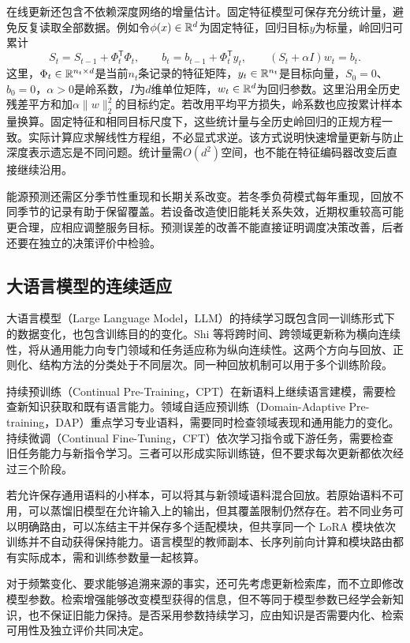 在线更新还包含不依赖深度网络的增量估计。固定特征模型可保存充分统计量，避免反复读取全部数据。例如令$\phi(x)\in\mathbb{R}^d$为固定特征，回归目标$y$为标量，岭回归可累计
\begin{equation}
 S_t=S_{t-1}+\Phi_t^{\mathsf T}\Phi_t,\qquad
 b_t=b_{t-1}+\Phi_t^{\mathsf T}y_t,\qquad
 (S_t+\alpha I)w_t=b_t.
\end{equation}
这里，$\Phi_t\in\mathbb{R}^{n_t\times d}$是当前$n_t$条记录的特征矩阵，$y_t\in\mathbb{R}^{n_t}$是目标向量，$S_0=0$、$b_0=0$，$\alpha>0$是岭系数，$I$为$d$维单位矩阵，$w_t\in\mathbb{R}^d$为回归参数。这里沿用全历史残差平方和加$\alpha\|w\|_2^2$的目标约定。若改用平均平方损失，岭系数也应按累计样本量换算。固定特征和相同目标尺度下，这些统计量与全历史岭回归的正规方程一致。实际计算应求解线性方程组，不必显式求逆。该方式说明快速增量更新与防止深度表示遗忘是不同问题。统计量需$O(d^2)$空间，也不能在特征编码器改变后直接继续沿用。

能源预测还需区分季节性重现和长期关系改变\cite{sayed2025energycl}。若冬季负荷模式每年重现，回放不同季节的记录有助于保留覆盖。若设备改造使旧能耗关系失效，近期权重较高可能更合理，应相应调整服务目标。预测误差的改善不能直接证明调度决策改善，后者还要在独立的决策评价中检验。

\subsection{大语言模型的连续适应}
大语言模型（Large Language Model，LLM）的持续学习既包含同一训练形式下的数据变化，也包含训练目的的变化。Shi 等将跨时间、跨领域更新称为横向连续性，将从通用能力向专门领域和任务适应称为纵向连续性\cite{shi2025llmcl}。这两个方向与回放、正则化、结构方法的分类处于不同层次。同一种回放机制可以用于多个训练阶段。

持续预训练（Continual Pre-Training，CPT）在新语料上继续语言建模，需要检查新知识获取和既有语言能力。领域自适应预训练（Domain-Adaptive Pre-training，DAP）重点学习专业语料，需要同时检查领域表现和通用能力的变化。持续微调（Continual Fine-Tuning，CFT）依次学习指令或下游任务，需要检查旧任务能力与新指令学习。三者可以形成实际训练链，但不要求每次更新都依次经过三个阶段。

若允许保存通用语料的小样本，可以将其与新领域语料混合回放。若原始语料不可用，可以蒸馏旧模型在允许输入上的输出，但其覆盖限制仍然存在。若不同业务可以明确路由，可以冻结主干并保存多个适配模块，但共享同一个 LoRA 模块依次训练并不自动获得保持能力。语言模型的教师副本、长序列前向计算和模块路由都有实际成本，需和训练参数量一起核算。

对于频繁变化、要求能够追溯来源的事实，还可先考虑更新检索库，而不立即修改模型参数。检索增强能够改变模型获得的信息，但不等同于模型参数已经学会新知识，也不保证旧能力保持。是否采用参数持续学习，应由知识是否需要内化、检索可用性及独立评价共同决定。

